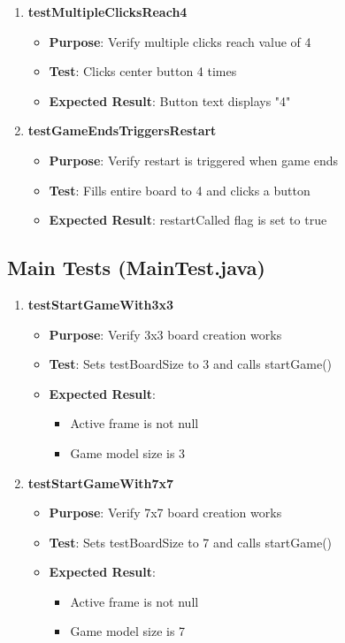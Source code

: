 \documentclass[12pt,a4paper]{article}
\begin{document}
\begin{enumerate}
    \item \textbf{testMultipleClicksReach4}
    \begin{itemize}
        \item \textbf{Purpose}: Verify multiple clicks reach value of 4
        \item \textbf{Test}: Clicks center button 4 times
        \item \textbf{Expected Result}: Button text displays "4"
    \end{itemize}
    
    \item \textbf{testGameEndsTriggersRestart}
    \begin{itemize}
        \item \textbf{Purpose}: Verify restart is triggered when game ends
        \item \textbf{Test}: Fills entire board to 4 and clicks a button
        \item \textbf{Expected Result}: restartCalled flag is set to true
    \end{itemize}
\end{enumerate}

\subsection{Main Tests (MainTest.java)}

\begin{enumerate}
    \item \textbf{testStartGameWith3x3}
    \begin{itemize}
        \item \textbf{Purpose}: Verify 3x3 board creation works
        \item \textbf{Test}: Sets testBoardSize to 3 and calls startGame()
        \item \textbf{Expected Result}: 
        \begin{itemize}
            \item Active frame is not null
            \item Game model size is 3
        \end{itemize}
    \end{itemize}
    
    \item \textbf{testStartGameWith7x7}
    \begin{itemize}
        \item \textbf{Purpose}: Verify 7x7 board creation works
        \item \textbf{Test}: Sets testBoardSize to 7 and calls startGame()
        \item \textbf{Expected Result}: 
        \begin{itemize}
            \item Active frame is not null
            \item Game model size is 7
        \end{itemize}
    \end{itemize}
\end{enumerate}
\end{document}
